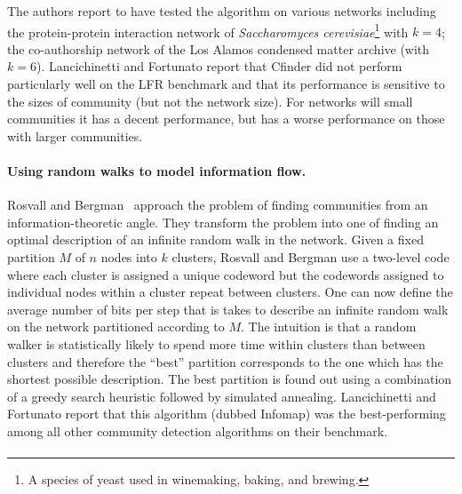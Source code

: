 The authors report to have tested the algorithm on various networks including the protein-protein interaction 
network of \emph{Saccharomyces cerevisiae}\footnote{A species of yeast used in winemaking, baking, and brewing.} 
with $k = 4$; the co-authorship network of the Los Alamos condensed matter archive (with $k = 6$). 
Lancichinetti and Fortunato report that Cfinder did not perform particularly well on the LFR benchmark and 
that its performance is sensitive to the sizes of community (but not the network size). For networks will 
small communities it has a decent performance, but has a worse performance on those with larger communities. 

\paragraph{Using random walks to model information flow.} Rosvall and Bergman~\cite{RB08} approach the 
problem of finding communities from an information-theoretic angle. They transform the problem 
into one of finding an optimal description of an infinite random walk in the network.  Given a fixed 
partition $M$ of $n$ nodes into $k$ clusters, Rosvall and Bergman use a two-level code where each 
cluster is assigned a unique codeword but the codewords assigned to individual nodes within a 
cluster repeat between clusters. One can now define the average number of bits per step that is 
takes to describe an infinite random walk on the network partitioned according to $M$. The intuition 
is that a random walker is statistically likely to spend more time within clusters than between clusters
and therefore the ``best'' partition corresponds to the one which has the shortest possible description.
The best partition is found out using a combination of a greedy search heuristic followed by simulated 
annealing. Lancichinetti and Fortunato report that this algorithm (dubbed Infomap) was the best-performing 
among all other community detection algorithms on their benchmark.  

\paragraph{}
